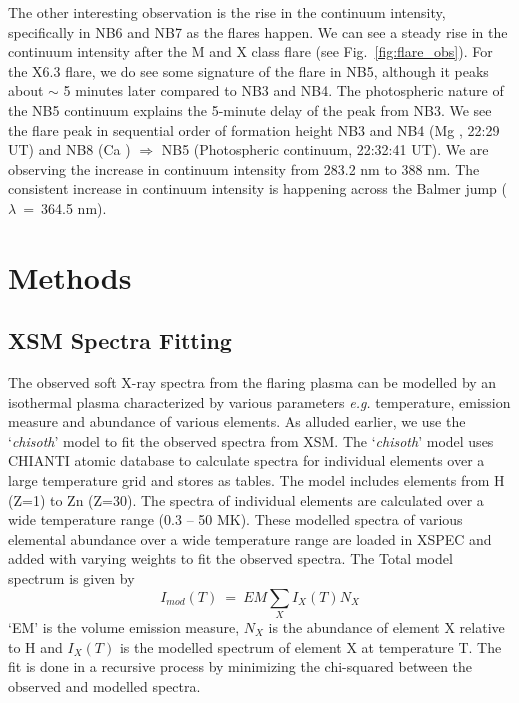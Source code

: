 \documentclass[lineno, pdflatex,sn-mathphys-ay]{sn-jnl}%
\begin{document}
The other interesting observation is the rise in the continuum intensity, specifically in NB6 and NB7 as the flares happen. We can see a steady rise in the continuum intensity after the M and X class flare (see Fig.~\ref{fig:flare_obs}). For the X6.3 flare, we do see some signature of the flare in NB5, although it peaks about $\sim$ 5 minutes later compared to NB3 and NB4. The photospheric nature of the NB5 continuum explains the 5-minute delay of the peak from NB3. We see the flare peak in sequential order of formation height NB3 and NB4 (Mg , 22:29 UT) and NB8 (Ca ) $\Longrightarrow$ NB5 (Photospheric continuum, 22:32:41 UT). We are observing the increase in continuum intensity from 283.2 nm to 388 nm. The consistent increase in continuum intensity is happening across the Balmer jump ($\lambda$~=~364.5 nm).

\section*{Methods}\label{sec:met}

\subsection*{XSM Spectra Fitting}

The observed soft X-ray spectra from the flaring plasma can be modelled by an isothermal plasma characterized by various parameters {\it e.g.} temperature, emission measure and abundance of various elements. As alluded earlier, we use the `{\it chisoth}' model \citep{mondal21} to fit the observed spectra from XSM. The `{\it chisoth}' model uses CHIANTI atomic database \cite{chianti} to calculate spectra for individual elements over a large temperature grid and stores as tables. The model includes elements from H (Z=1) to Zn (Z=30). The spectra of individual elements are calculated over a wide temperature range (0.3 {--} 50 MK). These modelled spectra of various elemental abundance over a wide temperature range are loaded in XSPEC and added with varying weights to fit the observed spectra. The Total model spectrum is given by  $$I_{mod}(T)~=~EM\sum_{X}I_{X}(T)N_{X}$$`EM' is the volume emission measure, $N_{X}$ is the abundance of element X relative to H and $I_{X}(T)$ is the modelled spectrum of element X at temperature T. The fit is done in a recursive process by minimizing the chi-squared between the observed and modelled spectra.
\end{document}
